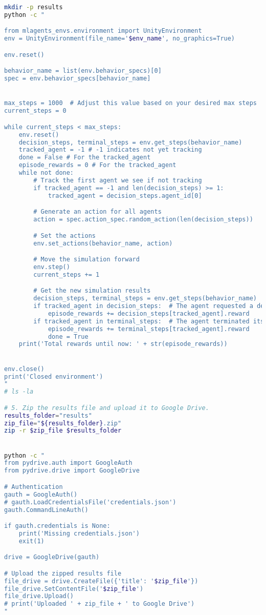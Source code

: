 \begin{lstlisting}[language=bash]
mkdir -p results
python -c "

from mlagents_envs.environment import UnityEnvironment
env = UnityEnvironment(file_name='$env_name', no_graphics=True)

env.reset()

behavior_name = list(env.behavior_specs)[0]
spec = env.behavior_specs[behavior_name]


max_steps = 1000  # Adjust this value based on your desired max steps
current_steps = 0

while current_steps < max_steps:
    env.reset()
    decision_steps, terminal_steps = env.get_steps(behavior_name)
    tracked_agent = -1 # -1 indicates not yet tracking
    done = False # For the tracked_agent
    episode_rewards = 0 # For the tracked_agent
    while not done:
        # Track the first agent we see if not tracking
        if tracked_agent == -1 and len(decision_steps) >= 1:
            tracked_agent = decision_steps.agent_id[0]

        # Generate an action for all agents
        action = spec.action_spec.random_action(len(decision_steps))

        # Set the actions
        env.set_actions(behavior_name, action)

        # Move the simulation forward
        env.step()
        current_steps += 1

        # Get the new simulation results
        decision_steps, terminal_steps = env.get_steps(behavior_name)
        if tracked_agent in decision_steps:  # The agent requested a decision
            episode_rewards += decision_steps[tracked_agent].reward
        if tracked_agent in terminal_steps:  # The agent terminated its episode
            episode_rewards += terminal_steps[tracked_agent].reward
            done = True
    print('Total rewards until now: ' + str(episode_rewards))


env.close()
print('Closed environment')
"
# ls -la

# 5. Zip the results file and upload it to Google Drive.
results_folder="results"
zip_file="${results_folder}.zip"
zip -r $zip_file $results_folder


python -c "
from pydrive.auth import GoogleAuth
from pydrive.drive import GoogleDrive

# Authentication
gauth = GoogleAuth()
# gauth.LoadCredentialsFile('credentials.json')
gauth.CommandLineAuth()

if gauth.credentials is None:
    print('Missing credentials.json')
    exit(1)

drive = GoogleDrive(gauth)

# Upload the zipped results file
file_drive = drive.CreateFile({'title': '$zip_file'})
file_drive.SetContentFile('$zip_file')
file_drive.Upload()
# print('Uploaded ' + zip_file + ' to Google Drive')
"

\end{lstlisting}
  
